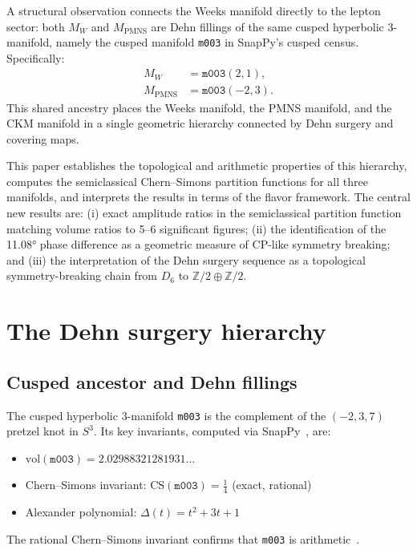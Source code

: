 \documentclass[12pt]{article}
\theoremstyle{definition}
\begin{document}
A structural observation connects the Weeks manifold directly to the
lepton sector: both $M_W$ and $M_\mathrm{PMNS}$ are Dehn fillings of
the same cusped hyperbolic 3-manifold, namely the cusped manifold
\texttt{m003} in SnapPy's cusped census. Specifically:
\begin{align}
  M_W &= \texttt{m003}(2,1), \label{eq:weeks_filling}\\
  M_\mathrm{PMNS} &= \texttt{m003}(-2,3). \label{eq:pmns_filling}
\end{align}
This shared ancestry places the Weeks manifold, the PMNS manifold, and
the CKM manifold in a single geometric hierarchy connected by Dehn
surgery and covering maps.

This paper establishes the topological and arithmetic properties of this
hierarchy, computes the semiclassical Chern--Simons partition functions
for all three manifolds, and interprets the results in terms of the
flavor framework. The central new results are: (i) exact amplitude
ratios in the semiclassical partition function matching volume ratios to
5--6 significant figures; (ii) the identification of the 11.08° phase
difference as a geometric measure of CP-like symmetry breaking; and
(iii) the interpretation of the Dehn surgery sequence as a topological
symmetry-breaking chain from $D_6$ to $\mathbb{Z}/2\oplus\mathbb{Z}/2$.

\section{The Dehn surgery hierarchy}
\label{sec:dehn}

\subsection{Cusped ancestor and Dehn fillings}

The cusped hyperbolic 3-manifold \texttt{m003} is the complement of
the $(-2,3,7)$ pretzel knot in $S^3$. Its key invariants, computed
via SnapPy~\cite{SnapPy}, are:
\begin{itemize}
  \item $\mathrm{vol}(\texttt{m003}) = 2.02988321281931\ldots$
  \item Chern--Simons invariant: $\mathrm{CS}(\texttt{m003}) =
    \tfrac{1}{4}$ (exact, rational)
  \item Alexander polynomial:
    $\Delta(t) = t^2 + 3t + 1$~\cite{Gentry:JKTR}
\end{itemize}
The rational Chern--Simons invariant confirms that \texttt{m003} is
arithmetic~\cite{Chinburg98}.
\end{document}
